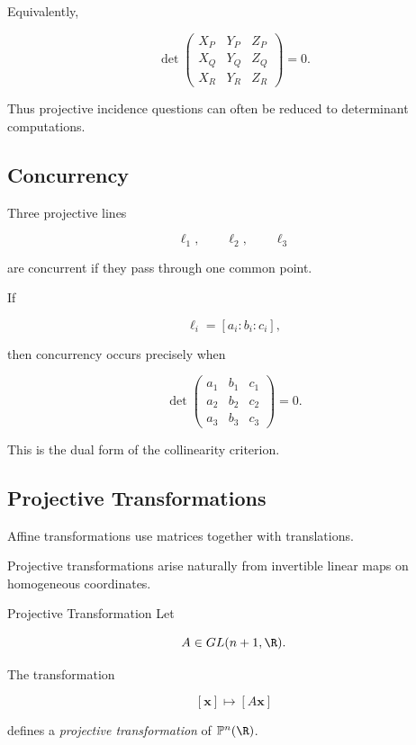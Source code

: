 Equivalently,

\[
\boxed{
\det
\begin{pmatrix}
X_P&Y_P&Z_P\\
X_Q&Y_Q&Z_Q\\
X_R&Y_R&Z_R
\end{pmatrix}
=0.
}
\]

Thus projective incidence questions can often be reduced to determinant
computations.

\subsection{Concurrency}
\label{subsec:projective-concurrency}

Three projective lines

\[
\ell_1,\qquad\ell_2,\qquad\ell_3
\]

are concurrent if they pass through one common point.

If

\[
\ell_i=[a_i:b_i:c_i],
\]

then concurrency occurs precisely when

\[
\boxed{
\det
\begin{pmatrix}
a_1&b_1&c_1\\
a_2&b_2&c_2\\
a_3&b_3&c_3
\end{pmatrix}
=0.
}
\]

This is the dual form of the collinearity criterion.

\subsection{Projective Transformations}
\label{subsec:projective-transformations}

Affine transformations use matrices together with translations.

Projective transformations arise naturally from invertible linear maps on
homogeneous coordinates.

\begin{definitionbox}{Projective Transformation}
Let

\[
A\in GL(n+1,\R).
\]

The transformation

\[
\boxed{
[\mathbf{x}]
\longmapsto
[A\mathbf{x}]
}
\]

defines a \emph{projective transformation} of
\(\mathbb{P}^{n}(\R)\).
\end{definitionbox}

